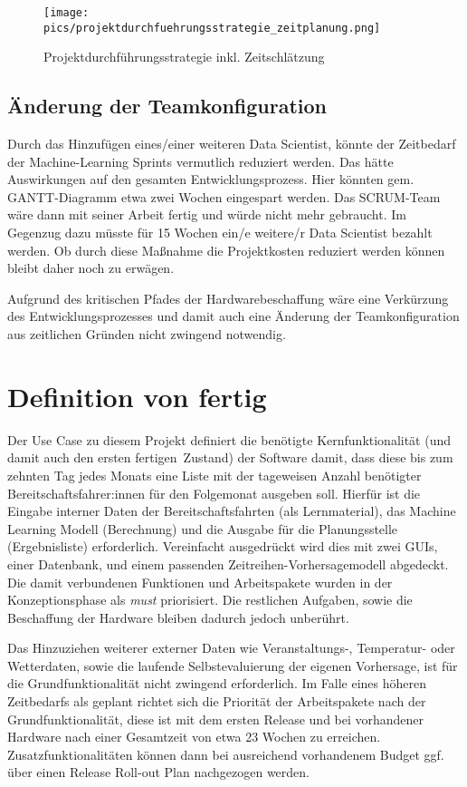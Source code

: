 \begin{figure}[h]
\centering
\texttt{[image: pics/projektdurchfuehrungsstrategie\_zeitplanung.png]}
\caption{Projektdurchführungsstrategie inkl. Zeitschlätzung} 
\label{fig:strategyplustime}
\end{figure}

\FloatBarrier

\subsection{Änderung der Teamkonfiguration}
\label{teamconfig}
Durch das Hinzufügen eines/einer weiteren Data Scientist, könnte der Zeitbedarf der Machine-Learning Sprints vermutlich reduziert werden. Das hätte Auswirkungen auf den gesamten Entwicklungsprozess. Hier könnten gem. GANTT-Diagramm etwa zwei Wochen eingespart werden. Das SCRUM-Team wäre dann mit seiner Arbeit fertig und würde nicht mehr gebraucht. Im Gegenzug dazu müsste für 15 Wochen ein/e weitere/r Data Scientist bezahlt werden. Ob durch diese Maßnahme die Projektkosten reduziert werden können bleibt daher noch zu erwägen.

Aufgrund des kritischen Pfades der Hardwarebeschaffung wäre eine Verkürzung des Entwicklungsprozesses und damit auch eine Änderung der Teamkonfiguration aus zeitlichen Gründen nicht zwingend notwendig. 

\section{Definition von \glqq fertig\grqq\ }
Der Use Case zu diesem Projekt \citep{grunsky_rettungsdienst_2024} definiert die benötigte Kernfunktionalität (und damit auch den ersten  \glqq fertigen\grqq\ Zustand) der Software damit, dass diese bis zum zehnten Tag jedes Monats eine Liste mit der tageweisen Anzahl benötigter Bereitschaftsfahrer:innen für den Folgemonat ausgeben soll. Hierfür ist die Eingabe interner Daten der Bereitschaftsfahrten (als Lernmaterial), das Machine Learning Modell (Berechnung) und die Ausgabe für die Planungsstelle (Ergebnisliste) erforderlich. Vereinfacht ausgedrückt wird dies mit zwei GUIs, einer Datenbank, und einem passenden Zeitreihen-Vorhersagemodell abgedeckt. Die damit verbundenen Funktionen und Arbeitspakete wurden in der Konzeptionsphase als \textit{\colorbox{hellrot}{must}} priorisiert. Die restlichen Aufgaben, sowie die Beschaffung der Hardware bleiben dadurch jedoch unberührt. 

Das Hinzuziehen weiterer externer Daten wie Veranstaltungs-, Temperatur- oder Wetterdaten, sowie die laufende Selbstevaluierung der eigenen Vorhersage, ist für die Grundfunktionalität nicht zwingend erforderlich. Im Falle eines höheren Zeitbedarfs als geplant richtet sich die Priorität der Arbeitspakete nach der Grundfunktionalität, diese ist mit dem ersten Release und bei vorhandener Hardware nach einer Gesamtzeit von etwa 23 Wochen zu erreichen. Zusatzfunktionalitäten können dann bei ausreichend vorhandenem Budget ggf. über einen Release Roll-out Plan nachgezogen werden.

